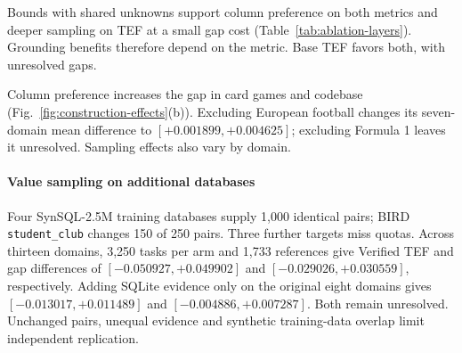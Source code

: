 Bounds with shared unknowns support column preference on both metrics and deeper sampling on TEF at a small gap cost (Table~\ref{tab:ablation-layers}). Grounding benefits therefore depend on the metric. Base TEF favors both, with unresolved gaps.

Column preference increases the gap in card games and codebase (Fig.~\ref{fig:construction-effects}(b)). Excluding European football changes its seven-domain mean difference to $[+0.001899,+0.004625]$; excluding Formula 1 leaves it unresolved. Sampling effects also vary by domain.

\paragraph{Value sampling on additional databases}
Four SynSQL-2.5M training databases \citep{li2025omnisql} supply 1,000 identical pairs; BIRD \texttt{student\_club} changes 150 of 250 pairs. Three further targets miss quotas. Across thirteen domains, 3,250 tasks per arm and 1,733 references give Verified TEF and gap differences of $[-0.050927,+0.049902]$ and $[-0.029026,+0.030559]$, respectively. Adding SQLite evidence only on the original eight domains gives $[-0.013017,+0.011489]$ and $[-0.004886,+0.007287]$. Both remain unresolved. Unchanged pairs, unequal evidence and synthetic training-data overlap limit independent replication.
